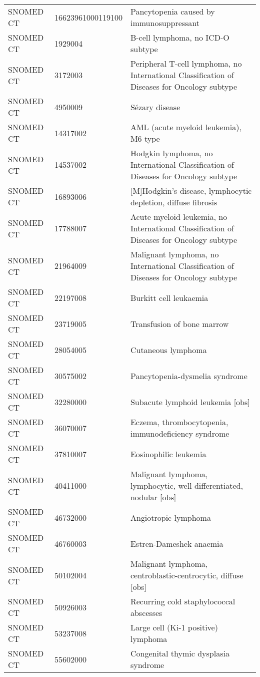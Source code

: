 \begin{longtable}{p{}p{}p{}}
  SNOMED CT & 16623961000119100 & Pancytopenia caused by immunosuppressant \\ 
  SNOMED CT & 1929004 & B-cell lymphoma, no ICD-O subtype \\ 
  SNOMED CT & 3172003 & Peripheral T-cell lymphoma, no International Classification of Diseases for Oncology subtype \\ 
  SNOMED CT & 4950009 & Sézary disease \\ 
  SNOMED CT & 14317002 & AML (acute myeloid leukemia), M6 type \\ 
  SNOMED CT & 14537002 & Hodgkin lymphoma, no International Classification of Diseases for Oncology subtype \\ 
  SNOMED CT & 16893006 & [M]Hodgkin's disease, lymphocytic depletion, diffuse fibrosis \\ 
  SNOMED CT & 17788007 & Acute myeloid leukemia, no International Classification of Diseases for Oncology subtype \\ 
  SNOMED CT & 21964009 & Malignant lymphoma, no International Classification of Diseases for Oncology subtype \\ 
  SNOMED CT & 22197008 & Burkitt cell leukaemia \\ 
  SNOMED CT & 23719005 & Transfusion of bone marrow \\ 
  SNOMED CT & 28054005 & Cutaneous lymphoma \\ 
  SNOMED CT & 30575002 & Pancytopenia-dysmelia syndrome \\ 
  SNOMED CT & 32280000 & Subacute lymphoid leukemia [obs] \\ 
  SNOMED CT & 36070007 & Eczema, thrombocytopenia, immunodeficiency syndrome \\ 
  SNOMED CT & 37810007 & Eosinophilic leukemia \\ 
  SNOMED CT & 40411000 & Malignant lymphoma, lymphocytic, well differentiated, nodular [obs] \\ 
  SNOMED CT & 46732000 & Angiotropic lymphoma \\ 
  SNOMED CT & 46760003 & Estren-Dameshek anaemia \\ 
  SNOMED CT & 50102004 & Malignant lymphoma, centroblastic-centrocytic, diffuse [obs] \\ 
  SNOMED CT & 50926003 & Recurring cold staphylococcal abscesses \\ 
  SNOMED CT & 53237008 & Large cell (Ki-1 positive) lymphoma \\ 
  SNOMED CT & 55602000 & Congenital thymic dysplasia syndrome \\ 

\end{longtable}

